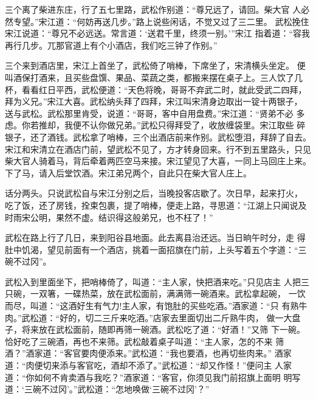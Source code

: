 三个离了柴进东庄，行了五七里路，武松作别道：“尊兄远了，请回。柴大官
人必然专望。”宋江道：“何妨再送几步。”路上说些闲话，不觉又过了三二里。
武松挽住宋江说道：“尊兄不必远送。常言道：‘送君千里，终须一别。’”宋江
指着道：“容我再行几步。兀那官道上有个小酒店，我们吃三钟了作别。”

三个来到酒店里，宋江上首坐了，武松倚了哨棒，下席坐了，宋清横头坐定。
便叫酒保打酒来，且买些盘馔、果品、菜蔬之类，都搬来摆在桌子上。三人饮了几
杯，看看红日平西，武松便道：“天色将晚，哥哥不弃武二时，就此受武二四拜，
拜为义兄。”宋江大喜。武松纳头拜了四拜，宋江叫宋清身边取出一锭十两银子，
送与武松。武松那里肯受，说道：“哥哥，客中自用盘费。”宋江道：“贤弟不必
多虑。你若推却，我便不认你做兄弟。”武松只得拜受了，收放缠袋里。宋江取些
碎银子，还了酒钱。武松拿了哨棒，三个出酒店前来作别。武松堕泪，拜辞了自去。
宋江和宋清立在酒店门前，望武松不见了，方才转身回来。行不到五里路头，只见
柴大官人骑着马，背后牵着两匹空马来接。宋江望见了大喜，一同上马回庄上来。
下了马，请入后堂饮酒。宋江弟兄两个，自此只在柴大官人庄上。

话分两头。只说武松自与宋江分别之后，当晚投客店歇了。次日早，起来打火，
吃了饭，还了房钱，拴束包裹，提了哨棒，便走上路，寻思道：“江湖上只闻说及
时雨宋公明，果然不虚。结识得这般弟兄，也不枉了！”

武松在路上行了几日，来到阳谷县地面。此去离县治还远。当日晌午时分，走
得肚中饥渴，望见前面有一个酒店，挑着一面招旗在门前，上头写着五个字道：“三
碗不过冈”。

武松入到里面坐下，把哨棒倚了，叫道：“主人家，快把酒来吃。”只见店主
人把三只碗，一双箸，一碟热菜，放在武松面前，满满筛一碗酒来。武松拿起碗，
一饮而尽，叫道：“这酒好生有气力!主人家，有饱肚的买些吃酒。”酒家道：“只
有熟牛肉。”武松道：“好的，切二三斤来吃酒。”店家去里面切出二斤熟牛肉，
做一大盘子，将来放在武松面前，随即再筛一碗酒。武松吃了道：“好酒！”又筛
下一碗。恰好吃了三碗酒，再也不来筛。武松敲着桌子叫道：“主人家，怎的不来
筛酒？”酒家道：“客官要肉便添来。”武松道：“我也要酒，也再切些肉来。”
酒家道：“肉便切来添与客官吃，酒却不添了。”武松道：“却又作怪！”便问主
人家道：“你如何不肯卖酒与我吃？”酒家道：“客官，你须见我门前招旗上面明
明写道：‘三碗不过冈’。”武松道：“怎地唤做‘三碗不过冈’？”

